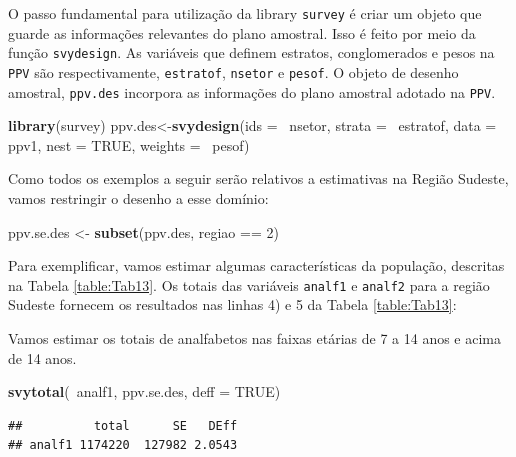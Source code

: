 \documentclass[]{book}
\newenvironment{Shaded}{\begin{snugshade}}{\end{snugshade}}
\newcommand{\KeywordTok}[1]{\textcolor[rgb]{0.13,0.29,0.53}{\textbf{{#1}}}}
\newcommand{\DataTypeTok}[1]{\textcolor[rgb]{0.13,0.29,0.53}{{#1}}}
\newcommand{\DecValTok}[1]{\textcolor[rgb]{0.00,0.00,0.81}{{#1}}}
\newcommand{\StringTok}[1]{\textcolor[rgb]{0.31,0.60,0.02}{{#1}}}
\newcommand{\OtherTok}[1]{\textcolor[rgb]{0.56,0.35,0.01}{{#1}}}
\newcommand{\NormalTok}[1]{{#1}}
\numberwithin{example}{chapter}
\numberwithin{remark}{chapter}
\numberwithin{definition}{chapter}
\begin{document}
O passo fundamental para utilização da library \texttt{survey} é criar
um objeto que guarde as informações relevantes do plano amostral. Isso é
feito por meio da função \texttt{svydesign}. As variáveis que definem
estratos, conglomerados e pesos na \texttt{PPV} são respectivamente,
\texttt{estratof}, \texttt{nsetor} e \texttt{pesof}. O objeto de desenho
amostral, \texttt{ppv.des} incorpora as informações do plano amostral
adotado na \texttt{PPV}.

\begin{Shaded}
\begin{Highlighting}[]
\KeywordTok{library}\NormalTok{(survey)}
\NormalTok{ppv.des<-}\KeywordTok{svydesign}\NormalTok{(}\DataTypeTok{ids =} \NormalTok{~nsetor, }\DataTypeTok{strata =} \NormalTok{~estratof,}
\DataTypeTok{data =} \NormalTok{ppv1, }\DataTypeTok{nest =} \OtherTok{TRUE}\NormalTok{, }\DataTypeTok{weights =} \NormalTok{~pesof)}
\end{Highlighting}
\end{Shaded}

Como todos os exemplos a seguir serão relativos a estimativas na Região
Sudeste, vamos restringir o desenho a esse domínio:

\begin{Shaded}
\begin{Highlighting}[]
\NormalTok{ppv.se.des <-}\StringTok{ }\KeywordTok{subset}\NormalTok{(ppv.des, regiao ==}\StringTok{ }\DecValTok{2}\NormalTok{)}
\end{Highlighting}
\end{Shaded}

Para exemplificar, vamos estimar algumas características da população,
descritas na Tabela \ref{table:Tab13}. Os totais das variáveis
\texttt{analf1} e \texttt{analf2} para a região Sudeste fornecem os
resultados nas linhas 4) e 5 da Tabela \ref{table:Tab13}:

Vamos estimar os totais de analfabetos nas faixas etárias de 7 a 14 anos
e acima de 14 anos.

\begin{Shaded}
\begin{Highlighting}[]
\KeywordTok{svytotal}\NormalTok{(~analf1, ppv.se.des, }\DataTypeTok{deff =} \OtherTok{TRUE}\NormalTok{)}
\end{Highlighting}
\end{Shaded}

\begin{verbatim}
##          total      SE   DEff
## analf1 1174220  127982 2.0543
\end{verbatim}
\end{document}
